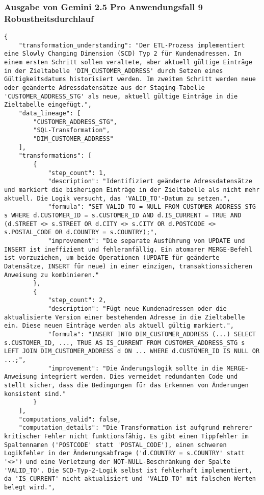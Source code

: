 \subsubsection{Ausgabe von Gemini 2.5 Pro Anwendungsfall 9 Robustheitsdurchlauf}\label{anhang:subsubsec:gemini_case9_prompt3}
\begin{lstlisting}[caption={Ausgabe: Gemini 2.5 Pro Anwendungsfall 9 Robustheitsdurchlauf},label={gemini_case9_prompt3}]
{
    "transformation_understanding": "Der ETL-Prozess implementiert eine Slowly Changing Dimension (SCD) Typ 2 für Kundenadressen. In einem ersten Schritt sollen veraltete, aber aktuell gültige Einträge in der Zieltabelle 'DIM_CUSTOMER_ADDRESS' durch Setzen eines Gültigkeitsdatums historisiert werden. Im zweiten Schritt werden neue oder geänderte Adressdatensätze aus der Staging-Tabelle 'CUSTOMER_ADDRESS_STG' als neue, aktuell gültige Einträge in die Zieltabelle eingefügt.",
    "data_lineage": [
        "CUSTOMER_ADDRESS_STG",
        "SQL-Transformation",
        "DIM_CUSTOMER_ADDRESS"
    ],
    "transformations": [
        {
            "step_count": 1,
            "description": "Identifiziert geänderte Adressdatensätze und markiert die bisherigen Einträge in der Zieltabelle als nicht mehr aktuell. Die Logik versucht, das 'VALID_TO'-Datum zu setzen.",
            "formula": "SET VALID_TO = NULL FROM CUSTOMER_ADDRESS_STG s WHERE d.CUSTOMER_ID = s.CUSTOMER_ID AND d.IS_CURRENT = TRUE AND (d.STREET <> s.STREET OR d.CITY <> s.CITY OR d.POSTCODE <> s.POSTAL_CODE OR d.COUNTRY = s.COUNTRY);",
            "improvement": "Die separate Ausführung von UPDATE und INSERT ist ineffizient und fehleranfällig. Ein atomarer MERGE-Befehl ist vorzuziehen, um beide Operationen (UPDATE für geänderte Datensätze, INSERT für neue) in einer einzigen, transaktionssicheren Anweisung zu kombinieren."
        },
        {
            "step_count": 2,
            "description": "Fügt neue Kundenadressen oder die aktualisierte Version einer bestehenden Adresse in die Zieltabelle ein. Diese neuen Einträge werden als aktuell gültig markiert.",
            "formula": "INSERT INTO DIM_CUSTOMER_ADDRESS (...) SELECT s.CUSTOMER_ID, ..., TRUE AS IS_CURRENT FROM CUSTOMER_ADDRESS_STG s LEFT JOIN DIM_CUSTOMER_ADDRESS d ON ... WHERE d.CUSTOMER_ID IS NULL OR ...;",
            "improvement": "Die Änderungslogik sollte in die MERGE-Anweisung integriert werden. Dies vermeidet redundanten Code und stellt sicher, dass die Bedingungen für das Erkennen von Änderungen konsistent sind."
        }
    ],
    "computations_valid": false,
    "computation_details": "Die Transformation ist aufgrund mehrerer kritischer Fehler nicht funktionsfähig. Es gibt einen Tippfehler im Spaltennamen ('POSTCODE' statt 'POSTAL_CODE'), einen schweren Logikfehler in der Änderungsabfrage ('d.COUNTRY = s.COUNTRY' statt '<>') und eine Verletzung der NOT-NULL-Beschränkung der Spalte 'VALID_TO'. Die SCD-Typ-2-Logik selbst ist fehlerhaft implementiert, da 'IS_CURRENT' nicht aktualisiert und 'VALID_TO' mit falschen Werten belegt wird.",

\end{lstlisting}

